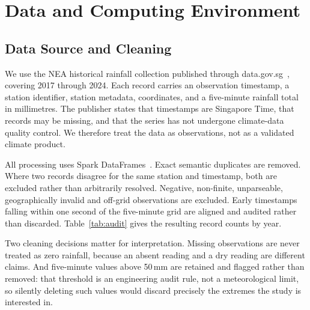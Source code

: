\documentclass[10pt,a4paper,twocolumn,twoside]{rho-class/rho}
\begin{document}
\section{Data and Computing Environment}

\subsection{Data Source and Cleaning}
We use the NEA historical rainfall collection published through data.gov.sg~\cite{NEARainfall}, covering 2017 through 2024. Each record carries an observation timestamp, a station identifier, station metadata, coordinates, and a five-minute rainfall total in millimetres. The publisher states that timestamps are Singapore Time, that records may be missing, and that the series has not undergone climate-data quality control. We therefore treat the data as observations, not as a validated climate product.

All processing uses Spark DataFrames~\cite{Lecture4,Lecture5}. Exact semantic duplicates are removed. Where two records disagree for the same station and timestamp, both are excluded rather than arbitrarily resolved. Negative, non-finite, unparseable, geographically invalid and off-grid observations are excluded. Early timestamps falling within one second of the five-minute grid are aligned and audited rather than discarded. Table~\ref{tab:audit} gives the resulting record counts by year.

Two cleaning decisions matter for interpretation. Missing observations are never treated as zero rainfall, because an absent reading and a dry reading are different claims. And five-minute values above 50\,mm are retained and flagged rather than removed: that threshold is an engineering audit rule, not a meteorological limit, so silently deleting such values would discard precisely the extremes the study is interested in.
\end{document}
